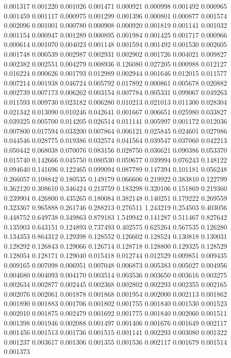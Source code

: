 0.001317
0.001220
0.001026
0.001471
0.000921
0.000998
0.001492
0.000965
0.001459
0.001117
0.000975
0.001299
0.001396
0.000801
0.000877
0.001574
0.002096
0.001001
0.000780
0.000908
0.000920
0.001819
0.001141
0.001032
0.001154
0.000947
0.001289
0.000895
0.001984
0.001425
0.001717
0.000966
0.000614
0.001070
0.004023
0.001148
0.001594
0.001492
0.001530
0.002605
0.001748
0.000539
0.002987
0.002931
0.002902
0.001726
0.004021
0.009827
0.002382
0.002551
0.004279
0.008936
0.126080
0.027205
0.000988
0.012127
0.016224
0.000626
0.001793
0.012989
0.002944
0.001646
0.012015
0.011577
0.007214
0.001938
0.046724
0.005792
0.017892
0.000861
0.005678
0.020882
0.002739
0.007173
0.006262
0.003154
0.007784
0.005331
0.099067
0.049263
0.011593
0.009730
0.023182
0.006280
0.010213
0.021013
0.011300
0.028304
0.021342
0.013090
0.010246
0.042641
0.001667
0.006651
0.025980
0.033827
0.039325
0.005700
0.014205
0.026514
0.011141
0.005997
0.001172
0.012036
0.007800
0.017594
0.033200
0.007864
0.006121
0.025845
0.024601
0.027986
0.044546
0.028775
0.019386
0.032574
0.041564
0.039547
0.037060
0.042213
0.050442
0.068038
0.070076
0.083156
0.028750
0.036621
0.090386
0.053370
0.015740
0.142666
0.045750
0.080530
0.059677
0.039994
0.076243
0.148122
0.094640
0.141696
0.122465
0.099094
0.087789
0.147394
0.101181
0.056248
0.266057
0.108842
0.180535
0.149179
0.066606
0.219922
0.383810
0.122799
0.362120
0.308610
0.346424
0.213759
0.183298
0.320106
0.151869
0.219360
0.239904
0.426800
0.435265
0.180084
0.382148
0.140251
0.179222
0.269559
0.323367
0.965888
0.261746
0.288213
0.276511
1.243219
0.254503
0.403056
0.448752
0.649738
0.349863
0.879183
1.549942
0.141287
0.511467
0.827642
0.135903
0.643151
0.124893
0.737493
0.402575
0.625264
0.567535
0.126280
0.134353
0.864312
0.129398
0.128552
0.126602
0.128524
0.130818
0.130031
0.128292
0.126843
0.129066
0.126714
0.128718
0.128800
0.129325
0.128529
0.128054
0.128171
0.129040
0.015418
0.012744
0.012529
0.009851
0.009435
0.009165
0.007098
0.006951
0.007048
0.006873
0.005383
0.005027
0.004956
0.004680
0.004093
0.004170
0.003514
0.003536
0.003650
0.003616
0.003275
0.002634
0.002877
0.002445
0.002368
0.002802
0.002293
0.002355
0.002165
0.002076
0.002061
0.001878
0.001868
0.001954
0.002000
0.002113
0.001862
0.001890
0.001883
0.001706
0.001802
0.001755
0.001840
0.001530
0.001523
0.002010
0.001875
0.002479
0.001692
0.001775
0.001840
0.002060
0.001511
0.001398
0.001946
0.002088
0.001497
0.001406
0.001676
0.001649
0.002117
0.001456
0.001513
0.001736
0.001515
0.001141
0.002293
0.003080
0.001322
0.001237
0.003617
0.001306
0.001355
0.001536
0.002117
0.001679
0.001514
0.001373
